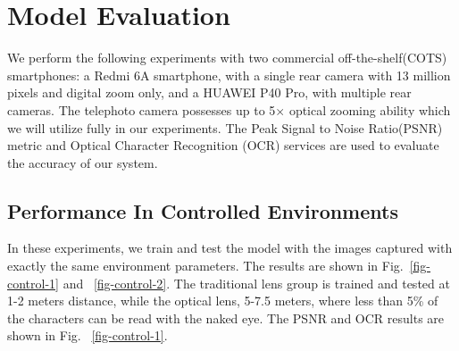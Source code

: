 \section{Model Evaluation}
\label{sec-evaluation}
We perform the following experiments with two commercial off-the-shelf(COTS) smartphones: a Redmi 6A smartphone, with a single rear camera with 13 million pixels and digital zoom only, and a HUAWEI P40 Pro, with multiple rear cameras. The telephoto camera possesses up to 5$\times$ optical zooming ability which we will utilize fully in our experiments. The Peak Signal to Noise Ratio(PSNR) metric and Optical Character Recognition (OCR) services are used to evaluate the accuracy of our system.
 
\subsection{Performance In Controlled Environments}

In these experiments, we train and test the model with the images captured with exactly the same environment parameters. The results are shown in Fig.~\ref{fig-control-1} and ~\ref{fig-control-2}. The traditional lens group is trained and tested at 1-2 meters distance, while the optical lens, 5-7.5 meters, where less than 5\% of the characters can be read with the naked eye. The PSNR and OCR results are shown in Fig. ~\ref{fig-control-1}.

